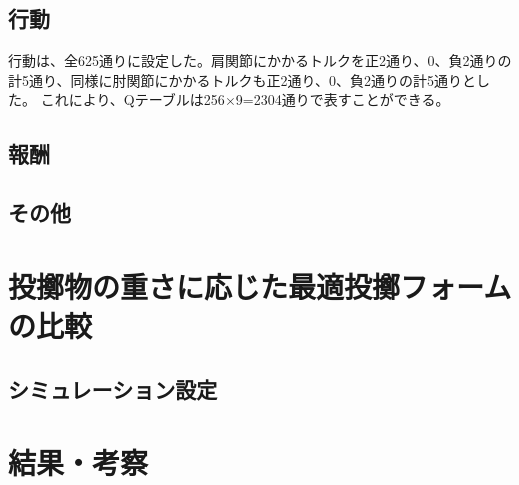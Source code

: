 \subsection{行動}
行動は、全625通りに設定した。肩関節にかかるトルクを正2通り、0、負2通りの計5通り、同様に肘関節にかかるトルクも正2通り、0、負2通りの計5通りとした。
これにより、Qテーブルは256$\times$9=2304通りで表すことができる。
\subsection{報酬}
\subsection{その他}
\section{投擲物の重さに応じた最適投擲フォームの比較}
\subsection{シミュレーション設定}
\section{結果・考察}
